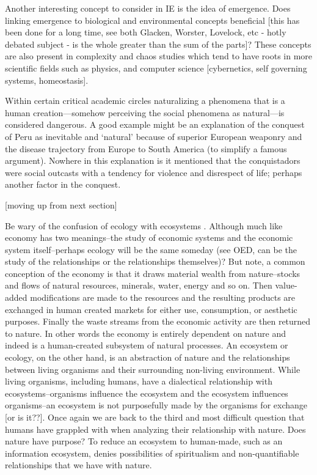 Another interesting concept to consider in IE is the idea of emergence. Does linking emergence to biological and environmental concepts beneficial [this has been done for a long time, see both Glacken, Worster, Lovelock, etc - hotly debated subject - is the whole greater than the sum of the parts]? These concepts are also present in complexity and chaos studies which tend to have roots in more scientific fields such as physics, and computer science [cybernetics, self governing systems, homeostasis].

Within certain critical academic circles naturalizing a phenomena that is a human creation—somehow perceiving the social phenomena as natural—is considered dangerous. A good example might be an explanation of the conquest of Peru as inevitable and ‘natural’ because of superior European weaponry and the disease trajectory from Europe to South America (to simplify a famous argument). Nowhere in this explanation is it mentioned that the conquistadors were social outcasts with a tendency for violence and disrespect of life; perhaps another factor in the conquest. 

[moving up from next section]

Be wary of the confusion of ecology with ecosystems \citep[cf. ][]{lucas_2012,nardi_information_1999}. Although much like economy has two meanings--the study of economic systems and the economic system itself--perhaps ecology will be the same someday (see OED, can be the study of the relationships or the relationships themselves)? But note, a common conception of the economy is that it draws material wealth from nature--stocks and flows of natural resources, minerals, water, energy and so on. Then value-added modifications are made to the resources and the resulting products are exchanged in human created markets for either use, consumption, or aesthetic purposes. Finally the waste streams from the economic activity are then returned to nature. In other words the economy is entirely dependent on nature and indeed is a human-created subsystem of natural processes. An ecosystem or ecology, on the other hand, is an abstraction of nature and the relationships between living organisms and their surrounding non-living environment. While living organisms, including humans, have a dialectical relationship with ecosystems--organisms influence the ecosystem and the ecosystem influences organisms--an ecosystem is not purposefully made by the organisms for exchange [or is it??]. Once again we are back to the third and most difficult question that humans have grappled with when analyzing their relationship with nature. Does nature have purpose? To reduce an ecosystem to human-made, such as an information ecosystem, denies possibilities of spiritualism and non-quantifiable relationships that we have with nature.

